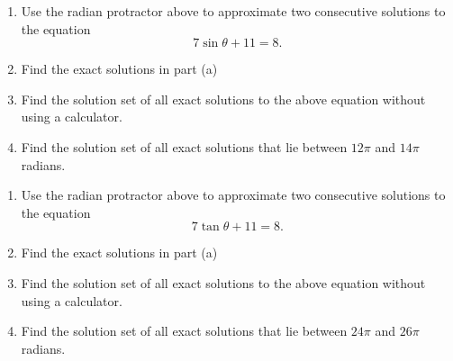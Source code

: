 \documentclass{ximera}
\begin{document}
\begin{question}  \label{QdfEEFR33g3e}

 
\begin{onlineOnly}
    \begin{center}
\end{center}
\end{onlineOnly}

\begin{enumerate}
\item Use the radian protractor above to approximate two consecutive solutions to the equation
\[
   7 \sin\theta +11 =  8 .  
\]

\item Find the exact solutions in part (a)

\item Find the solution set of all exact solutions to the above equation without using a calculator.

\item Find the solution set of all exact solutions that lie between $12\pi$ and $14\pi$ radians.

\end{enumerate}
\end{question}



\begin{question}  \label{QDEFklEFR33g3e}

 
\begin{onlineOnly}
    \begin{center}
\end{center}
\end{onlineOnly}

\begin{enumerate}
\item Use the radian protractor above to approximate two consecutive solutions to the equation
\[
   7 \tan\theta +11 =  8 .  
\]

\item Find the exact solutions in part (a)

\item Find the solution set of all exact solutions to the above equation without using a calculator.

\item Find the solution set of all exact solutions that lie between $24\pi$ and $26\pi$ radians.

\end{enumerate}
\end{question}

 
\end{document}
